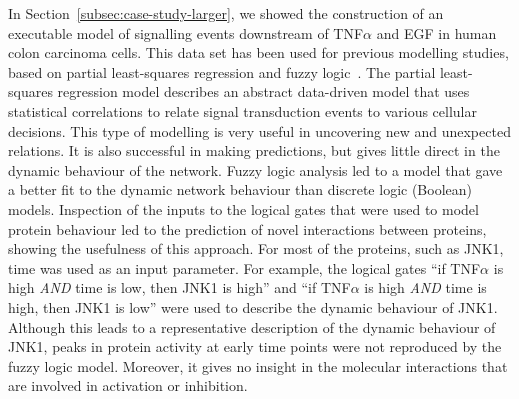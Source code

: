 \documentclass{bmcart}
\begin{document}
In Section~\ref{subsec:case-study-larger}, we showed the construction of an executable model
of signalling events downstream of
TNF$\alpha$ and EGF in human colon carcinoma cells. This data set has been used for
previous modelling studies, based on partial least-squares regression and fuzzy 
logic~\cite{pathway-leastsquare,pathway-fuzzy}.
The partial least-squares regression model describes an abstract data-driven model 
that uses statistical correlations
to relate signal transduction events to various cellular decisions. This type of modelling is
very useful in uncovering new and unexpected relations. It is also successful in making
predictions, but gives little direct in the dynamic behaviour of the network. Fuzzy
logic analysis led to a model that gave a better fit to the dynamic network behaviour than
discrete logic (Boolean) models. Inspection of the inputs to the logical gates that were used
to model protein behaviour led to the prediction of novel interactions between proteins,
showing the usefulness of this approach. For most of the proteins, such as JNK1, time was
used as an input parameter. For example, the logical gates ``if TNF$\alpha$ is high
\emph{AND} time is low, then JNK1 is high'' and ``if TNF$\alpha$ is high \emph{AND} time is
high, then JNK1 is low'' were used to
describe the dynamic behaviour of JNK1. Although this leads to a representative
description of the dynamic behaviour of JNK1, peaks in protein activity at early time points were
not reproduced by the fuzzy logic model. Moreover, it gives no insight in the molecular interactions 
that are involved in activation or inhibition.
\end{document}
